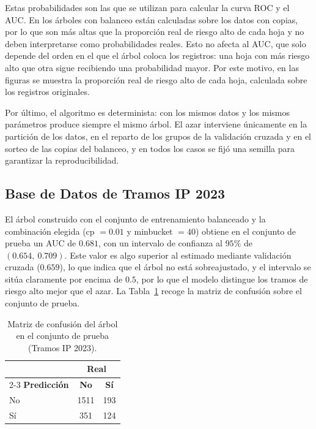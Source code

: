 \documentclass[twoside,a4paper,12pt,onecolumn,openany]{book}
\begin{document}
\vspace{0.5cm}
 
Estas probabilidades son las que se utilizan para calcular la curva ROC y el AUC. En los árboles con balanceo están calculadas sobre los datos con copias, por lo que son más altas que la proporción real de riesgo alto de cada hoja y no deben interpretarse como probabilidades reales. Esto no afecta al AUC, que solo depende del orden en el que el árbol coloca los registros: una hoja con más riesgo alto que otra sigue recibiendo una probabilidad mayor. Por este motivo, en las figuras se muestra la proporción real de riesgo alto de cada hoja, calculada sobre los registros originales.
 
\vspace{0.5cm}
 
Por último, el algoritmo es determinista: con los mismos datos y los mismos parámetros produce siempre el mismo árbol. El azar interviene únicamente en la partición de los datos, en el reparto de los grupos de la validación cruzada y en el sorteo de las copias del balanceo, y en todos los casos se fijó una semilla para garantizar la reproducibilidad.

 
\subsection{Base de Datos de Tramos IP 2023}
 
El árbol construido con el conjunto de entrenamiento balanceado y la combinación elegida (cp $=0.01$ y minbucket $=40$) obtiene en el conjunto de prueba un AUC de $0.681$, con un intervalo de confianza al $95\%$ de $(0.654,\ 0.709)$. Este valor es algo superior al estimado mediante validación cruzada ($0.659$), lo que indica que el árbol no está sobreajustado, y el intervalo se sitúa claramente por encima de $0.5$, por lo que el modelo distingue los tramos de riesgo alto mejor que el azar. La Tabla~\ref{tab:confusion_ip_2023} recoge la matriz de confusión sobre el conjunto de prueba.
 
\begin{table}[H]
    \centering
    \vspace{0.3cm}
    \renewcommand{\arraystretch}{1.3}
    \begin{tabular}{lcc}
        \toprule
        & \multicolumn{2}{c}{\textbf{Real}} \\
        \cmidrule(lr){2-3}
        \textbf{Predicción} & \textbf{No} & \textbf{Sí} \\
        \midrule
        No & 1511 & 193 \\
        Sí & 351  & 124 \\
        \bottomrule
    \end{tabular}
    \caption{Matriz de confusión del árbol en el conjunto de prueba (Tramos IP 2023).}
    \label{tab:confusion_ip_2023}
\end{table}
 
\end{document}
